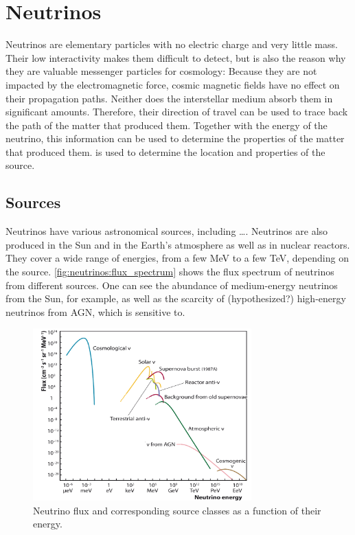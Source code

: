 \section{Neutrinos}

Neutrinos are elementary particles with no electric charge and very little mass.
Their low interactivity
  makes them difficult to detect,
  but is also the reason why they are valuable messenger particles for cosmology:
Because they are not impacted by the electromagnetic force,
  cosmic magnetic fields have no effect on their propagation paths. \cite{neutrinos_katz}
Neither does the interstellar medium absorb them in significant amounts.
Therefore,
  their direction of travel can be used to trace back the path of the matter that produced them.
Together with the energy of the neutrino,
  this information can be used to determine the properties of the matter that produced them.
  is used to determine the location and properties of the source. \cite{neutrinos_katz}


\subsection{Sources}
Neutrinos have various astronomical sources,
including
  …. %
Neutrinos are also produced in
  the Sun
  and in the Earth's atmosphere
  as well as in nuclear reactors.
They cover a wide range of energies, from a few \si{\mega\electronvolt} to a few \si{\tera\electronvolt},
  depending on the source.
%
\autoref{fig:neutrinos:flux_spectrum} shows the flux spectrum of neutrinos from different sources.
One can see
  the abundance of medium-energy neutrinos from the Sun,
    for example,
  as well as the scarcity of (hypothesized?) high-energy neutrinos from AGN,
    which \icecube is sensitive to.

\begin{figure}
  \centering
  \includegraphics[width=0.75\textwidth]{content/plots/halftime/neutrinos-energy.png}
  \caption{Neutrino flux and corresponding source classes as a function of their energy. \citationneeded{}}
  \label{fig:neutrinos:flux_spectrum}
\end{figure}


